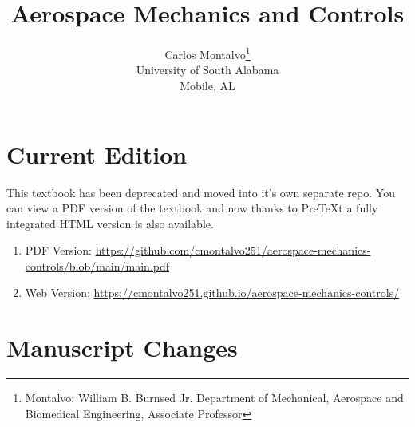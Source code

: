 \documentclass{article}
\begin{document}
\title{Aerospace Mechanics and Controls}
\author{Carlos Montalvo\footnote{Montalvo: William B. Burnsed Jr. Department of Mechanical, Aerospace and Biomedical Engineering, Associate Professor}
  \\University of South Alabama\\Mobile, AL}

\maketitle

\linespread{1}

\newpage

\section*{Current Edition}

\noindent This textbook has been deprecated and moved into it's own
separate repo. You can view a PDF version of the textbook and now
thanks to PreTeXt a fully integrated HTML version is also available.
\begin{enumerate}[itemsep=-5pt]
  \item PDF Version:
    \url{https://github.com/cmontalvo251/aerospace-mechanics-controls/blob/main/main.pdf}
  \item Web Version:
    \url{https://cmontalvo251.github.io/aerospace-mechanics-controls/}
\end{enumerate}

\section*{Manuscript Changes}
\end{document}

